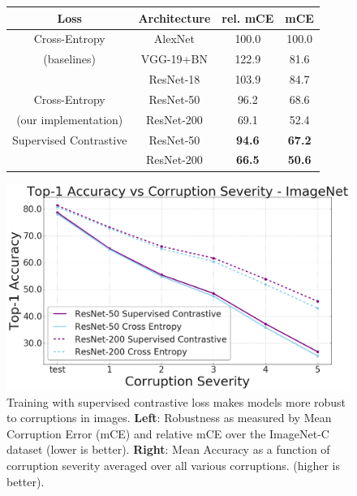 \begin{figure}[t]
\centering
\begin{minipage}[t]{.6\linewidth}
\small
\setlength{\tabcolsep}{2pt}
\vspace{0pt}
\centering
\begin{tabular}{cccc} 
 \toprule
  Loss & Architecture & rel. mCE & mCE \\\midrule
 Cross-Entropy & AlexNet \cite{krizhevsky2012imagenet} & 100.0 & 100.0 \\
 (baselines)& VGG-19+BN \cite{Simonyan15} & 122.9 & 81.6 \\
 & ResNet-18 \cite{he2016deep} & 103.9 & 84.7 \\\midrule
 Cross-Entropy & ResNet-50 & 96.2 & 68.6 \\
 (our implementation)& ResNet-200 & 69.1 & 52.4 \\ 
 \midrule
 Supervised Contrastive & ResNet-50 & {\bf 94.6} & {\bf 67.2} \\
 & ResNet-200 & {\bf 66.5} & {\bf 50.6} \\ \bottomrule
\end{tabular}
\end{minipage}%
\begin{minipage}[t]{.4\linewidth}
\vspace{0pt}
\centering
\includegraphics[width=0.9\linewidth]{figs/corrupt_top1.png}
\end{minipage}

\caption{ Training with supervised contrastive loss makes models more robust to corruptions in images. {\bf Left}: Robustness as measured by Mean Corruption Error (mCE) and relative mCE over the ImageNet-C dataset \cite{hendrycks2019benchmarking} (lower is better). {\bf Right}: Mean Accuracy as a function of corruption severity averaged over all various corruptions. (higher is better).}
\label{table:robustness}

\end{figure}

